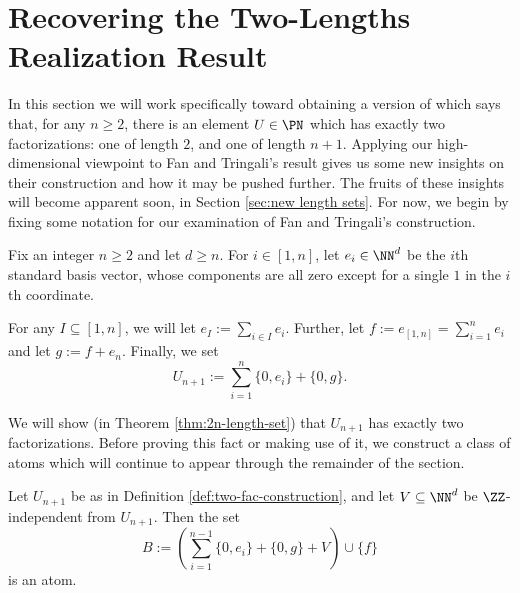 \section{Recovering the Two-Lengths Realization Result} \label{sec:recovering length sets}
In this section we will work specifically toward obtaining a version of \cite[Proposition 4.10]{fan-tringali18} which says that, for any $n\ge 2$, there is an element $U\in \PN$ which has exactly two factorizations: one of length $2$, and one of length $n+1$.
Applying our high-dimensional viewpoint to Fan and Tringali's result gives us some new insights on their construction and how it may be pushed further.
The fruits of these insights will become apparent soon, in Section \ref{sec:new length sets}.
For now, we begin by fixing some notation for our examination of Fan and Tringali's construction.

\begin{defn} \label{def:two-fac-construction}
	Fix an integer $n\ge 2$ and let $d\ge n$.
	For $i\in [ 1,n]$, let $e_i \in \NN^d$ be the $i$th standard basis vector, whose components are all zero except for a single $1$ in the $i$th coordinate.
	
	For any $I \subseteq [ 1,n ]$, we will let $e_I := \sum_{i\in I} e_i$.
	Further, let $f := e_{[ 1,n ]} = \sum_{i=1}^n e_i$ and let $g := f + e_n$.
	Finally, we set
	\[U_{n+1} := \sum_{i=1}^n \{0,e_i\} + \{0,g\}.\]
\end{defn}

We will show (in Theorem \ref{thm:2n-length-set}) that $U_{n+1}$ has exactly two factorizations. 
Before proving this fact or making use of it, we construct a class of atoms which will continue to appear through the remainder of the section.

\begin{lemma} \label{lem:large-atom-two-fac}
	Let $U_{n+1}$ be as in Definition \ref{def:two-fac-construction}, and let $V\subseteq \NN^d$ be $\ZZ$-independent from $U_{n+1}$.
	Then the set
	\[ B:= \left( \sum_{i=1}^{n-1} \{0,e_i\} + \{0,g\} + V \right) \cup \{f\} \]
	is an atom.
\end{lemma}

